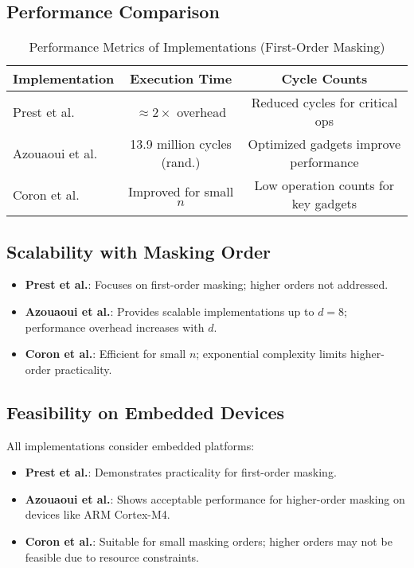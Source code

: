 \subsection{Performance Comparison}

\begin{table}[h]
    \centering
    \caption{Performance Metrics of Implementations (First-Order Masking)}
    \begin{tabular}{lcc}
        \toprule
        \textbf{Implementation} & \textbf{Execution Time}     & \textbf{Cycle Counts}                 \\
        \midrule
        Prest et al.\           & $\approx 2\times$ overhead  & Reduced cycles for critical ops       \\
        Azouaoui et al.\        & 13.9 million cycles (rand.) & Optimized gadgets improve performance \\
        Coron et al.\           & Improved for small $n$      & Low operation counts for key gadgets  \\
        \bottomrule
    \end{tabular}
    \label{tab:performance_metrics}
\end{table}

\subsection{Scalability with Masking Order}

\begin{itemize}
    \item \textbf{Prest et al.}: Focuses on first-order masking; higher orders not addressed.
    \item \textbf{Azouaoui et al.}: Provides scalable implementations up to $d = 8$; performance overhead increases with $d$.
    \item \textbf{Coron et al.}: Efficient for small $n$; exponential complexity limits higher-order practicality.
\end{itemize}

\subsection{Feasibility on Embedded Devices}

All implementations consider embedded platforms:

\begin{itemize}
    \item \textbf{Prest et al.}: Demonstrates practicality for first-order masking.
    \item \textbf{Azouaoui et al.}: Shows acceptable performance for higher-order masking on devices like ARM Cortex-M4.
    \item \textbf{Coron et al.}: Suitable for small masking orders; higher orders may not be feasible due to resource constraints.
\end{itemize}

